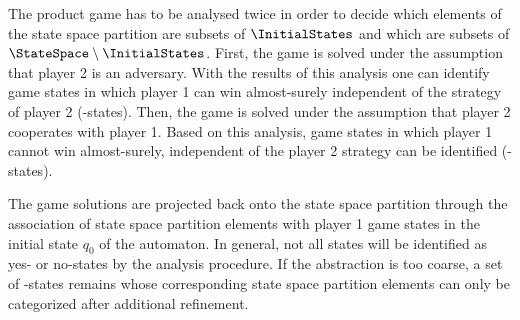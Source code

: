 The product game has to be analysed twice in order to decide which elements of the state space partition are subsets of $\InitialStates$ and which are subsets of $\StateSpace \setminus \InitialStates$.
First, the game is solved under the assumption that player 2 is an adversary.
With the results of this analysis one can identify game states in which player 1 can win almost-surely independent of the strategy of player 2 (-states).
Then, the game is solved under the assumption that player 2 cooperates with player 1.
Based on this analysis, game states in which player 1 cannot win almost-surely, independent of the player 2 strategy can be identified (-states).

The game solutions are projected back onto the state space partition  through the association of state space partition elements with player 1 game states in the initial state $q_0$ of the automaton.
In general, not all states will be identified as yes- or no-states by the analysis procedure.
If the abstraction is too coarse, a set of -states remains whose corresponding state space partition elements can only be categorized after additional refinement.


    \startalgorithmic[numbering=no,margin=0em]
    \stopalgorithmic
    \startalgorithmic
        \DO
            \DO
                \DO
    \stopalgorithmic
\stopbuffer

